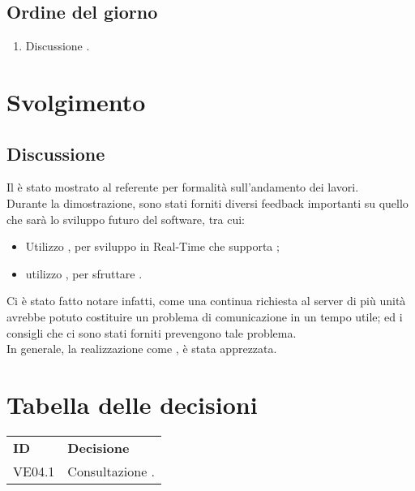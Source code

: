 \documentclass[]{article}
\begin{document}
	\subsection{Ordine del giorno}
	\begin{enumerate}
		\item Discussione .
	\end{enumerate}
	\newpage
	\section{Svolgimento}


	\subsection{Discussione }
	Il  è stato mostrato al referente per formalità sull'andamento dei lavori. \\
	Durante la dimostrazione, sono stati forniti diversi feedback importanti su quello che sarà lo sviluppo futuro del software, tra cui:
	\begin{itemize}
		\item Utilizzo , per sviluppo in Real-Time che supporta ;
		\item utilizzo , per sfruttare .\\
	\end{itemize}

	Ci è stato fatto notare infatti, come una continua richiesta al server di più unità avrebbe potuto costituire un problema di comunicazione in un tempo utile; ed i consigli che ci sono stati forniti prevengono tale problema. \\
	In generale, la realizzazione come , è stata apprezzata.



	\newpage

	\section{Tabella delle decisioni}

	\begin{table} [h!]
		\begin{center}
			\begin{tabular} { m{2cm} m{14cm} }
				\rowcolor{lightgray}
				\textbf{ID} & \textbf{Decisione}\\
				VE04.1 & Consultazione \glock{Atmosphere}.\\

			\end{tabular}
		\end{center}
	\end{table}
\end{document}

